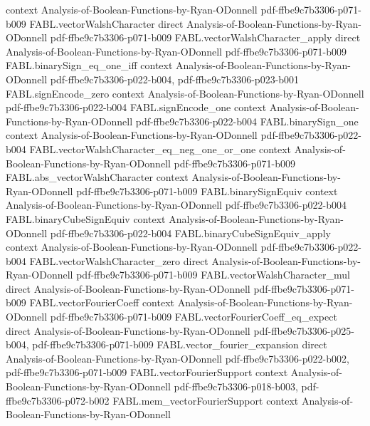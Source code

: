 \begin{theorem}
  {context}
  {Analysis-of-Boolean-Functions-by-Ryan-ODonnell}
  {pdf-ffbe9c7b3306-p071-b009}
\proofstep
  {FABL.vectorWalshCharacter}
  {direct}
  {Analysis-of-Boolean-Functions-by-Ryan-ODonnell}
  {pdf-ffbe9c7b3306-p071-b009}
\proofstep
  {FABL.vectorWalshCharacter_apply}
  {direct}
  {Analysis-of-Boolean-Functions-by-Ryan-ODonnell}
  {pdf-ffbe9c7b3306-p071-b009}
\proofstep
  {FABL.binarySign_eq_one_iff}
  {context}
  {Analysis-of-Boolean-Functions-by-Ryan-ODonnell}
  {pdf-ffbe9c7b3306-p022-b004,
    pdf-ffbe9c7b3306-p023-b001}
\proofstep
  {FABL.signEncode_zero}
  {context}
  {Analysis-of-Boolean-Functions-by-Ryan-ODonnell}
  {pdf-ffbe9c7b3306-p022-b004}
\proofstep
  {FABL.signEncode_one}
  {context}
  {Analysis-of-Boolean-Functions-by-Ryan-ODonnell}
  {pdf-ffbe9c7b3306-p022-b004}
\proofstep
  {FABL.binarySign_one}
  {context}
  {Analysis-of-Boolean-Functions-by-Ryan-ODonnell}
  {pdf-ffbe9c7b3306-p022-b004}
\proofstep
  {FABL.vectorWalshCharacter_eq_neg_one_or_one}
  {context}
  {Analysis-of-Boolean-Functions-by-Ryan-ODonnell}
  {pdf-ffbe9c7b3306-p071-b009}
\proofstep
  {FABL.abs_vectorWalshCharacter}
  {context}
  {Analysis-of-Boolean-Functions-by-Ryan-ODonnell}
  {pdf-ffbe9c7b3306-p071-b009}
\proofstep
  {FABL.binarySignEquiv}
  {context}
  {Analysis-of-Boolean-Functions-by-Ryan-ODonnell}
  {pdf-ffbe9c7b3306-p022-b004}
\proofstep
  {FABL.binaryCubeSignEquiv}
  {context}
  {Analysis-of-Boolean-Functions-by-Ryan-ODonnell}
  {pdf-ffbe9c7b3306-p022-b004}
\proofstep
  {FABL.binaryCubeSignEquiv_apply}
  {context}
  {Analysis-of-Boolean-Functions-by-Ryan-ODonnell}
  {pdf-ffbe9c7b3306-p022-b004}
\proofstep
  {FABL.vectorWalshCharacter_zero}
  {direct}
  {Analysis-of-Boolean-Functions-by-Ryan-ODonnell}
  {pdf-ffbe9c7b3306-p071-b009}
\proofstep
  {FABL.vectorWalshCharacter_mul}
  {direct}
  {Analysis-of-Boolean-Functions-by-Ryan-ODonnell}
  {pdf-ffbe9c7b3306-p071-b009}
\proofstep
  {FABL.vectorFourierCoeff}
  {context}
  {Analysis-of-Boolean-Functions-by-Ryan-ODonnell}
  {pdf-ffbe9c7b3306-p071-b009}
\proofstep
  {FABL.vectorFourierCoeff_eq_expect}
  {direct}
  {Analysis-of-Boolean-Functions-by-Ryan-ODonnell}
  {pdf-ffbe9c7b3306-p025-b004,
    pdf-ffbe9c7b3306-p071-b009}
\proofstep
  {FABL.vector_fourier_expansion}
  {direct}
  {Analysis-of-Boolean-Functions-by-Ryan-ODonnell}
  {pdf-ffbe9c7b3306-p022-b002,
    pdf-ffbe9c7b3306-p071-b009}
\proofstep
  {FABL.vectorFourierSupport}
  {context}
  {Analysis-of-Boolean-Functions-by-Ryan-ODonnell}
  {pdf-ffbe9c7b3306-p018-b003,
    pdf-ffbe9c7b3306-p072-b002}
\proofstep
  {FABL.mem_vectorFourierSupport}
  {context}
  {Analysis-of-Boolean-Functions-by-Ryan-ODonnell}

\end{theorem}
